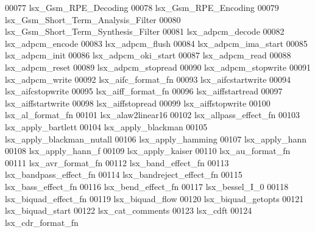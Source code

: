\begin{DoxyCode}
00077 \textcolor{stringliteral}{lsx\_Gsm\_RPE\_Decoding}
00078 \textcolor{stringliteral}{lsx\_Gsm\_RPE\_Encoding}
00079 \textcolor{stringliteral}{lsx\_Gsm\_Short\_Term\_Analysis\_Filter}
00080 \textcolor{stringliteral}{lsx\_Gsm\_Short\_Term\_Synthesis\_Filter}
00081 \textcolor{stringliteral}{lsx\_adpcm\_decode}
00082 \textcolor{stringliteral}{lsx\_adpcm\_encode}
00083 \textcolor{stringliteral}{lsx\_adpcm\_flush}
00084 \textcolor{stringliteral}{lsx\_adpcm\_ima\_start}
00085 \textcolor{stringliteral}{lsx\_adpcm\_init}
00086 \textcolor{stringliteral}{lsx\_adpcm\_oki\_start}
00087 \textcolor{stringliteral}{lsx\_adpcm\_read}
00088 \textcolor{stringliteral}{lsx\_adpcm\_reset}
00089 \textcolor{stringliteral}{lsx\_adpcm\_stopread}
00090 \textcolor{stringliteral}{lsx\_adpcm\_stopwrite}
00091 \textcolor{stringliteral}{lsx\_adpcm\_write}
00092 \textcolor{stringliteral}{lsx\_aifc\_format\_fn}
00093 \textcolor{stringliteral}{lsx\_aifcstartwrite}
00094 \textcolor{stringliteral}{lsx\_aifcstopwrite}
00095 \textcolor{stringliteral}{lsx\_aiff\_format\_fn}
00096 \textcolor{stringliteral}{lsx\_aiffstartread}
00097 \textcolor{stringliteral}{lsx\_aiffstartwrite}
00098 \textcolor{stringliteral}{lsx\_aiffstopread}
00099 \textcolor{stringliteral}{lsx\_aiffstopwrite}
00100 \textcolor{stringliteral}{lsx\_al\_format\_fn}
00101 \textcolor{stringliteral}{lsx\_alaw2linear16}
00102 \textcolor{stringliteral}{lsx\_allpass\_effect\_fn}
00103 \textcolor{stringliteral}{lsx\_apply\_bartlett}
00104 \textcolor{stringliteral}{lsx\_apply\_blackman}
00105 \textcolor{stringliteral}{lsx\_apply\_blackman\_nutall}
00106 \textcolor{stringliteral}{lsx\_apply\_hamming}
00107 \textcolor{stringliteral}{lsx\_apply\_hann}
00108 \textcolor{stringliteral}{lsx\_apply\_hann\_f}
00109 \textcolor{stringliteral}{lsx\_apply\_kaiser}
00110 \textcolor{stringliteral}{lsx\_au\_format\_fn}
00111 \textcolor{stringliteral}{lsx\_avr\_format\_fn}
00112 \textcolor{stringliteral}{lsx\_band\_effect\_fn}
00113 \textcolor{stringliteral}{lsx\_bandpass\_effect\_fn}
00114 \textcolor{stringliteral}{lsx\_bandreject\_effect\_fn}
00115 \textcolor{stringliteral}{lsx\_bass\_effect\_fn}
00116 \textcolor{stringliteral}{lsx\_bend\_effect\_fn}
00117 \textcolor{stringliteral}{lsx\_bessel\_I\_0}
00118 \textcolor{stringliteral}{lsx\_biquad\_effect\_fn}
00119 \textcolor{stringliteral}{lsx\_biquad\_flow}
00120 \textcolor{stringliteral}{lsx\_biquad\_getopts}
00121 \textcolor{stringliteral}{lsx\_biquad\_start}
00122 \textcolor{stringliteral}{lsx\_cat\_comments}
00123 \textcolor{stringliteral}{lsx\_cdft}
00124 \textcolor{stringliteral}{lsx\_cdr\_format\_fn}

\end{DoxyCode}
